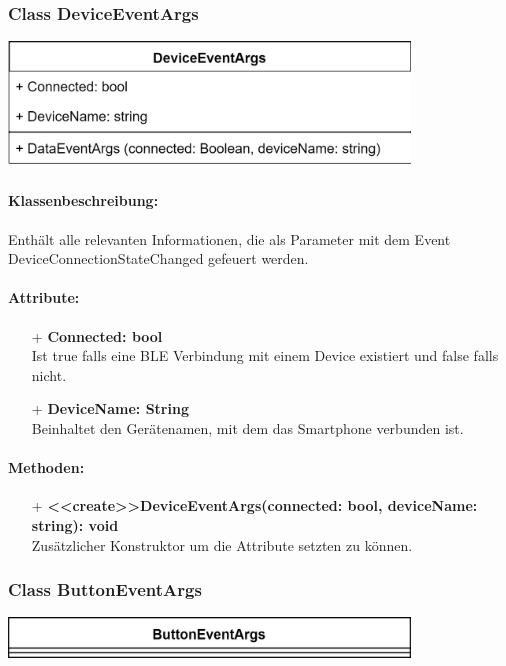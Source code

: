 \documentclass[a4paper,12pt]{article}
\begin{document}
\begin{minipage}[b]{0.5\textwidth}
	\subsubsection{Class DeviceEventArgs}
	
	\end{minipage}
	\begin{minipage}[c]{0.5\textwidth}
	\includegraphics[width=0.8\textwidth]{bilder/BibPackageKlassen/DeviceEventArgs.png}
\end{minipage}
\paragraph{Klassenbeschreibung:}
Enthält alle relevanten Informationen, die als Parameter mit dem Event DeviceConnectionStateChanged gefeuert werden.

\paragraph{Attribute:}
\begin{itemize}
	\item[+] \textbf{Connected: bool}\\Ist true falls eine BLE Verbindung mit einem Device existiert und false falls nicht.
	\item[+] \textbf{DeviceName: String}\\Beinhaltet den Gerätenamen, mit dem das Smartphone verbunden ist. 
\end{itemize}

\paragraph{Methoden:}
\begin{itemize}
	\item[+] \textbf{<<create>>DeviceEventArgs(connected: bool, deviceName: string): void}\\ Zusätzlicher Konstruktor um die Attribute setzten zu können.
\end{itemize}

\begin{minipage}[b]{0.5\textwidth}
	\subsubsection{Class ButtonEventArgs}
	
	\end{minipage}
	\begin{minipage}[c]{0.5\textwidth}
	\includegraphics[width=0.8\textwidth]{bilder/BibPackageKlassen/ButtonEventArgs.png}
\end{minipage}
\end{document}

